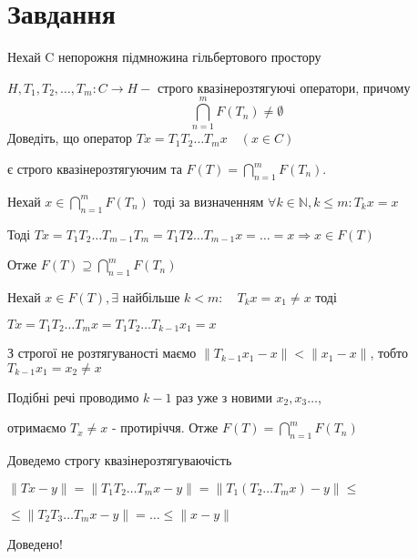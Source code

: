 
\chapter{Завдання \theHchapter}

\begin{tcolorbox}[title=Завдання]
    Нехай C непорожня підмножина гільбертового простору 
    
    
    $H, T_{1}, T_{2}, \ldots, T_{m}: C \rightarrow H-$ 
    строго квазінерозтягуючі оператори, причому 
    $$\bigcap_{n=1}^{m} F\left(T_{n}\right) \neq \emptyset$$
    Доведіть, що оператор
    $T x=T_{1} T_{2} \ldots T_{m} x \quad(x \in C)$


    є строго квазінерозтягуючим та 
    $F(T)=\bigcap\limits_{n=1}^{m} F\left(T_{n}\right)$.


\end{tcolorbox}



Нехай $x \in \bigcap\limits_{n=1}^mF(T_n)$ тоді за визначенням 
$\forall k \in \mathbb{N}, k \le m: T_kx = x$


Тоді $Tx = T_1T_2\dots T_{m-1}T_m = T_1T2\dots T_{m-1}x = \dots = x 
\Rightarrow x \in F(T)$ 


Отже $F(T) \supseteq \bigcap\limits_{n=1}^mF(T_n)$


Нехай $x \in F(T), \exists$ найбільше $ k < m: \quad T_k x = x_1 \neq x$ тоді 


$Tx = T_1T_2\dots T_mx = T_1T_2\dots T_{k-1}x_1 = x$


З строгої не розтягуваності маємо $\|T_{k-1}x_1 - x\| < \|x_1-x\|$, 
тобто $T_{k-1}x_1 = x_2 \neq x$


Подібні речі проводимо $k-1$ раз уже з новими $x_2, x_3 \dots$, 


отримаємо $T_x \neq x$ - протиріччя. Отже $F(T) = \bigcap\limits_{n=1}^mF(T_n)$


Доведемо строгу квазінерозтягуваючість 


$\|Tx - y\| = \|T_1T_2\dots T_m x - y\| = \|T_1(T_2\dots T_m x) - y\| \le$


$\le \|T_2T_3\dots T_m x - y\| = \dots \le \|x - y\|$


Доведено!
